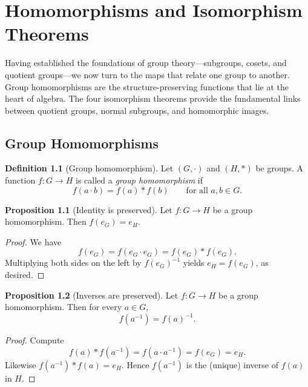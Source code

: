 \documentclass[12pt,a4paper,openany]{book}
\theoremstyle{definition}
\newtheorem{definition}{Definition}[chapter]
\newtheorem{proposition}{Proposition}[chapter]
\theoremstyle{remark}
\begin{document}
\chapter{Homomorphisms and Isomorphism Theorems}\label{ch:homomorphisms}

Having established the foundations of group theory—subgroups, cosets,
and quotient groups—we now turn to the maps that relate one group to
another.  Group homomorphisms are the structure-preserving functions
that lie at the heart of algebra.  The four isomorphism theorems
provide the fundamental links between quotient groups, normal
subgroups, and homomorphic images.

\section{Group Homomorphisms}\label{sec:group-homomorphism-def}

\begin{definition}[Group homomorphism]\label{def:group-homomorphism}
Let $(G,\cdot)$ and $(H,\ast)$ be groups.  A function $f\colon G\to H$
is called a \emph{group homomorphism} if
\[
   f(a\cdot b) = f(a)\ast f(b)
   \qquad\text{for all } a,b\in G.
\]
\end{definition}

\begin{proposition}[Identity is preserved]\label{prop:hom-identity}
Let $f\colon G\to H$ be a group homomorphism.  Then $f(e_G)=e_H$.
\end{proposition}

\begin{proof}
We have
\[
   f(e_G) = f(e_G \cdot e_G) = f(e_G)\ast f(e_G).
\]
Multiplying both sides on the left by $f(e_G)^{-1}$ yields
$e_H = f(e_G)$, as desired.
\end{proof}

\begin{proposition}[Inverses are preserved]\label{prop:hom-inverse}
Let $f\colon G\to H$ be a group homomorphism.  Then for every
$a\in G$,
\[
   f(a^{-1}) = f(a)^{-1}.
\]
\end{proposition}

\begin{proof}
Compute
\[
   f(a)\ast f(a^{-1}) = f(a\cdot a^{-1}) = f(e_G) = e_H.
\]
Likewise $f(a^{-1})\ast f(a) = e_H$.  Hence $f(a^{-1})$ is the
(unique) inverse of $f(a)$ in $H$.
\end{proof}
\end{document}
